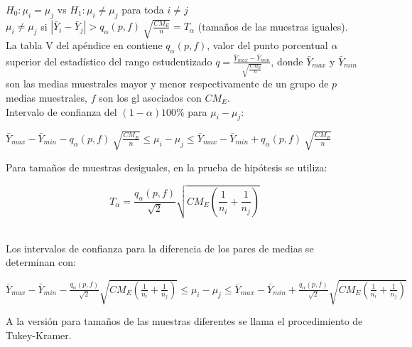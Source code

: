 $H_{0}:\mu_{i} = \mu_{j}$ vs $H_{1}:\mu_{i} \neq \mu_{j}$ para toda $i \neq j$\\

 $\mu_{i} \neq \mu_{j}$ si $| \bar{Y}_{i} -\bar{Y}_{j} | > q_{\alpha} (p,f) \: \sqrt{\frac{CM_{E}}{n}} = T_{\alpha}$ (tamaños de las muestras iguales).\\
 

La tabla V del apéndice en \textcite{montgomery-2017} contiene $q_{\alpha} (p,f)$, valor del punto porcentual $\alpha$ superior del estadístico del rango estudentizado {\large $q=\frac{ \bar{Y}_{max} -\bar{Y}_{min}}{ \sqrt{\frac{CM_{E}}{n}}}$}, donde $\bar{Y}_{max}$ y $\bar{Y}_{min}$ son las medias muestrales mayor y menor respectivamente de un grupo de $p$ medias muestrales, $f$ son los gl asociados con $CM_{E}$.\\
 
Intervalo de confianza del  $(1-\alpha)100\%$ para $\mu_{i} - \mu_{j}$:\\
 
\begin{center}
	$ \bar{Y}_{max} -\bar{Y}_{min} -  q_{\alpha} (p,f) \: \sqrt{\frac{CM_{E}}{n}} \leq \mu_{i} - \mu_{j} \leq \bar{Y}_{max} -\bar{Y}_{min} + q_{\alpha} (p,f) \: \sqrt{\frac{CM_{E}}{n}} $ \\
\end{center}

Para tamaños de muestras desiguales, en la prueba de hipótesis se utiliza:\\

\begin{center}
	$$ T_{\alpha} = \frac{q_{\alpha} (p,f)}{\sqrt{2}} \sqrt{CM_{E} (\frac{1}{n_{i}} + \frac{1}{n_{j}})}  $$ \\
\end{center}


Los intervalos de confianza para la diferencia de los pares de medias se determinan con:\\


\begin{center}
	$ \bar{Y}_{max} -\bar{Y}_{min} -  \frac{q_{\alpha} (p,f)}{\sqrt{2}} \sqrt{CM_{E} (\frac{1}{n_{i}} + \frac{1}{n_{j}})}  \leq \mu_{i} - \mu_{j} \leq \bar{Y}_{max} -\bar{Y}_{min} + \frac{q_{\alpha} (p,f)}{\sqrt{2}} \sqrt{CM_{E} (\frac{1}{n_{i}} + \frac{1}{n_{j}})}  $ \\
\end{center}

A la versión para tamaños de las muestras diferentes se llama el procedimiento de Tukey-Kramer.
